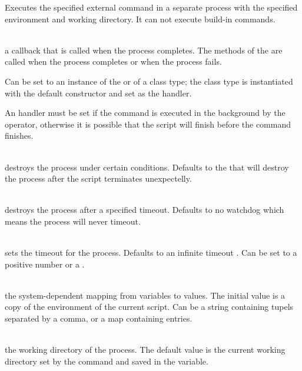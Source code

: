 %


Executes the specified external command in a separate process with the
specified environment and working directory. It can not execute build-in commands.

\begin{asparaitem}
%
\item[\code{handler: ExecuteResultHandler}] \hfill \\
a callback that is called when the process completes. 
The methods of the \cite{executeresulthandler13} 
are called when the process completes or when the process fails.

Can be set to an instance of the  or of a class 
type; the class type is instantiated with the default
constructor and set as the handler.

An handler must be set if the command is executed in the background by the 
operator, otherwise it is possible that the script will finish before the command finishes.
%
\item[\code{destroyer: ProcessDestroyer}] \hfill \\
\cite{processdestroyer13}  destroys the process under certain conditions.
Defaults to the \cite{shutdownhookprocessdestroyer13}
that will destroy the process after the script terminates unexpectelly.
%
\item[\code{watchdog}] \hfill \\
destroys the process after a specified timeout. Defaults to 
no watchdog which means the process will never timeout.
%
\item[\code{timeout: (+)number|duration}] \hfill \\
sets the timeout for the process. Defaults to an infinite 
timeout  . Can be set to a positive
number or a \cite{duration13}.
%
\item[\code{env}] \hfill \\
the system-dependent mapping from variables
to values. The initial value is a copy of the environment of the current
script. Can be a string containing  tupels
separated by a comma, or a map containing  entries.
%
\item[\code{dir}] \hfill \\
the working directory of the process. The default value
is the current working directory set by the  command
and saved in the  variable.
%
\end{asparaitem}

